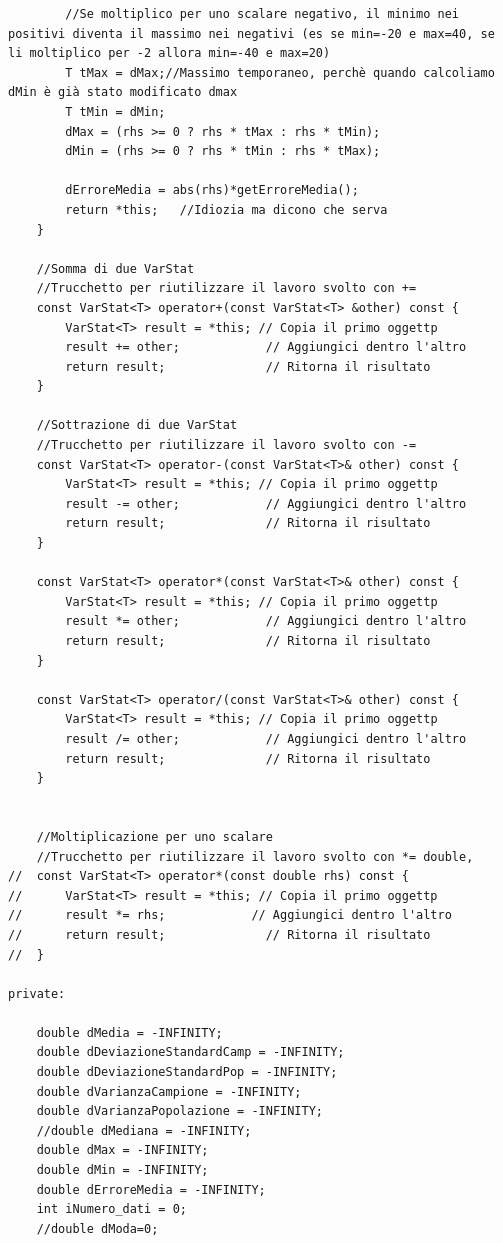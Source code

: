 \documentclass[12pt]{article} %
\begin{document}
\begin{verbatim}
		//Se moltiplico per uno scalare negativo, il minimo nei positivi diventa il massimo nei negativi (es se min=-20 e max=40, se li moltiplico per -2 allora min=-40 e max=20)
		T tMax = dMax;//Massimo temporaneo, perchè quando calcoliamo dMin è già stato modificato dmax
		T tMin = dMin;
		dMax = (rhs >= 0 ? rhs * tMax : rhs * tMin);
		dMin = (rhs >= 0 ? rhs * tMin : rhs * tMax);

		dErroreMedia = abs(rhs)*getErroreMedia();
		return *this;	//Idiozia ma dicono che serva
	}

	//Somma di due VarStat
	//Trucchetto per riutilizzare il lavoro svolto con +=
	const VarStat<T> operator+(const VarStat<T> &other) const {
		VarStat<T> result = *this; // Copia il primo oggettp
		result += other;            // Aggiungici dentro l'altro
		return result;              // Ritorna il risultato
	}

	//Sottrazione di due VarStat
	//Trucchetto per riutilizzare il lavoro svolto con -=
	const VarStat<T> operator-(const VarStat<T>& other) const {
		VarStat<T> result = *this; // Copia il primo oggettp
		result -= other;            // Aggiungici dentro l'altro
		return result;              // Ritorna il risultato
	}

	const VarStat<T> operator*(const VarStat<T>& other) const {
		VarStat<T> result = *this; // Copia il primo oggettp
		result *= other;            // Aggiungici dentro l'altro
		return result;              // Ritorna il risultato
	}

	const VarStat<T> operator/(const VarStat<T>& other) const {
		VarStat<T> result = *this; // Copia il primo oggettp
		result /= other;            // Aggiungici dentro l'altro
		return result;              // Ritorna il risultato
	}


	//Moltiplicazione per uno scalare
	//Trucchetto per riutilizzare il lavoro svolto con *= double,
//	const VarStat<T> operator*(const double rhs) const {
//		VarStat<T> result = *this; // Copia il primo oggettp
//		result *= rhs;            // Aggiungici dentro l'altro
//		return result;              // Ritorna il risultato
//	}

private:

	double dMedia = -INFINITY;
	double dDeviazioneStandardCamp = -INFINITY;
	double dDeviazioneStandardPop = -INFINITY;
	double dVarianzaCampione = -INFINITY;
	double dVarianzaPopolazione = -INFINITY;
	//double dMediana = -INFINITY;
	double dMax = -INFINITY;
	double dMin = -INFINITY;
	double dErroreMedia = -INFINITY;
	int iNumero_dati = 0;
	//double dModa=0;


\end{verbatim}
\end{document}
